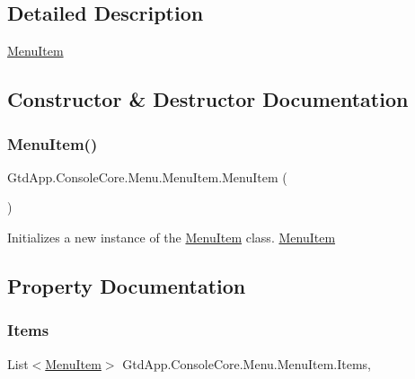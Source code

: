 \subsection{Detailed Description}
\mbox{\hyperlink{class_gtd_app_1_1_console_core_1_1_menu_1_1_menu_item}{Menu\+Item}} 



\subsection{Constructor \& Destructor Documentation}
\mbox{\label{class_gtd_app_1_1_console_core_1_1_menu_1_1_menu_item_aa41874b8e2f75eff6bd15cedb1ca9683}} 
\subsubsection{\texorpdfstring{Menu\+Item()}{MenuItem()}}
{\footnotesize\ttfamily Gtd\+App.\+Console\+Core.\+Menu.\+Menu\+Item.\+Menu\+Item (\begin{DoxyParamCaption}{ }\end{DoxyParamCaption})}



Initializes a new instance of the \mbox{\hyperlink{class_gtd_app_1_1_console_core_1_1_menu_1_1_menu_item}{Menu\+Item}} class. \mbox{\hyperlink{class_gtd_app_1_1_console_core_1_1_menu_1_1_menu_item}{Menu\+Item}} 



\subsection{Property Documentation}
\mbox{\label{class_gtd_app_1_1_console_core_1_1_menu_1_1_menu_item_ad6d341e3919294dcd9581db39060db85}} 
\subsubsection{\texorpdfstring{Items}{Items}}
{\footnotesize\ttfamily List$<$\mbox{\hyperlink{class_gtd_app_1_1_console_core_1_1_menu_1_1_menu_item}{Menu\+Item}}$>$ Gtd\+App.\+Console\+Core.\+Menu.\+Menu\+Item.\+Items\hspace{0.3cm}{\ttfamily [get]}, {\ttfamily [set]}}



